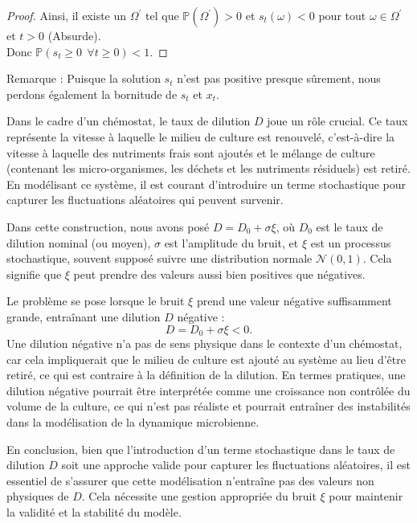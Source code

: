 \documentclass[12pt,a4paper]{report}%
\newcounter{remm}[chapter]
\newenvironment{remarque}[2][]
  {\refstepcounter{remm}
  \begin{bclogo}[
    couleur=white,
    arrondi=0.1,
    couleurBord=white,#1]{Remarque \theremm:#2}
  }
  {\end{bclogo}}
\begin{document}
\begin{proof}
 	Ainsi, il existe un \(\Omega^\prime\) tel que \(\mathbb{P}(\Omega^\prime) > 0\) et \(s_t(\omega) < 0\) pour tout \(\omega \in \Omega^\prime\) et $t>0$ (Absurde).\\
 	Donc  \(\mathbb{P}( s_t \geqslant 0 \;\, \forall t \geq 0) < 1\).
 \end{proof}
\begin{remarque}{}\label{re}
	Puisque la solution $s_t$ n'est pas positive presque sûrement, nous perdons également la bornitude de $s_t$ et $x_t$.
\end{remarque}

 
 Dans le cadre d'un chémostat, le taux de dilution \(D\) joue un rôle crucial. Ce taux représente la vitesse à laquelle le milieu de culture est renouvelé, c'est-à-dire la vitesse à laquelle des nutriments frais sont ajoutés et le mélange de culture (contenant les micro-organismes, les déchets et les nutriments résiduels) est retiré. En modélisant ce système, il est courant d'introduire un terme stochastique pour capturer les fluctuations aléatoires qui peuvent survenir.
 
 Dans cette construction, nous avons posé \(D = D_0 + \sigma \xi\), où \(D_0\) est le taux de dilution nominal (ou moyen), \(\sigma\) est l'amplitude du bruit, et \(\xi\) est un processus stochastique, souvent supposé suivre une distribution normale \(\mathcal{N}(0,1)\). Cela signifie que \(\xi\) peut prendre des valeurs aussi bien positives que négatives.
 
 Le problème se pose lorsque le bruit \(\xi\) prend une valeur négative suffisamment grande, entraînant une dilution \(D\) négative :
 \[ D = D_0 + \sigma \xi < 0. \]
 Une dilution négative n'a pas de sens physique dans le contexte d'un chémostat, car cela impliquerait que le milieu de culture est ajouté au système au lieu d'être retiré, ce qui est contraire à la définition de la dilution. En termes pratiques, une dilution négative pourrait être interprétée comme une croissance non contrôlée du volume de la culture, ce qui n'est pas réaliste et pourrait entraîner des instabilités dans la modélisation de la dynamique microbienne.
 
 En conclusion, bien que l'introduction d'un terme stochastique dans le taux de dilution \(D\) soit une approche valide pour capturer les fluctuations aléatoires, il est essentiel de s'assurer que cette modélisation n'entraîne pas des valeurs non physiques de \(D\). Cela nécessite une gestion appropriée du bruit \(\xi\) pour maintenir la validité et la stabilité du modèle.
\end{document}
